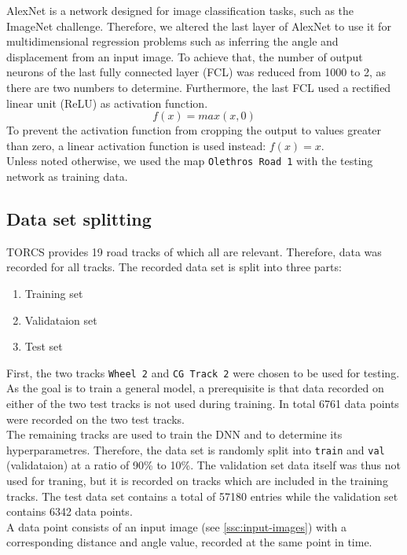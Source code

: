 \documentclass[10pt,a4paper,twoside,journal]{IEEEtran}
\begin{document}
AlexNet is a network designed for image classification tasks, such as the ImageNet challenge. Therefore, we altered the last layer of AlexNet to use it for multidimensional regression problems such as inferring the angle and displacement from an input image. To achieve that, the number of output neurons of the last fully connected layer (FCL) was reduced from 1000 to 2, as there are two numbers to determine. Furthermore, the last FCL used a rectified linear unit (ReLU) as activation function. 
\begin{equation}
	f(x) = max(x, 0)
\end{equation}
To prevent the activation function from cropping the output to values greater than zero, a linear activation function is used instead: $ f(x) = x $. \\
Unless noted otherwise, we used the map \texttt{Olethros Road 1} with the testing network as training data. 


\subsection{Data set splitting}
\label{ssc:data-set-split}
TORCS provides 19 road tracks of which all are relevant. Therefore, data was recorded for all tracks. The recorded data set is split into three parts: 
\begin{enumerate}
	\item Training set
	\item Validataion set
	\item Test set
\end{enumerate}
First, the two tracks \texttt{Wheel 2} and \texttt{CG Track 2} were chosen to be used for testing. As the goal is to train a general model, a prerequisite is that data recorded on either of the two test tracks is not used during training. In total 6761 data points were recorded on the two test tracks. \\
The remaining tracks are used to train the DNN and to determine its hyperparametres. Therefore, the data set is randomly split into \texttt{train} and \texttt{val} (validataion) at a ratio of 90\% to 10\%. The validation set data itself was thus not used for traning, but it is recorded on tracks which are included in the training tracks. The test data set contains a total of 57180 entries while the validation set contains 6342 data points. \\
A data point consists of an input image (see \autoref{ssc:input-images}) with a corresponding distance and angle value, recorded at the same point in time.
\end{document}
